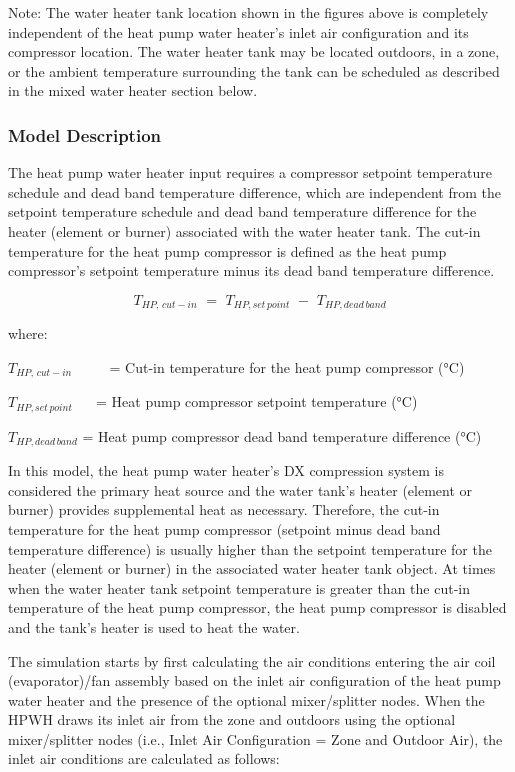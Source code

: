 Note: The water heater tank location shown in the figures above is completely independent of the heat pump water heater's inlet air configuration and its compressor location. The water heater tank may be located outdoors, in a zone, or the ambient temperature surrounding the tank can be scheduled as described in the mixed water heater section below.

\subsubsection{Model Description}\label{model-description-016}

The heat pump water heater input requires a compressor setpoint temperature schedule and dead band temperature difference, which are independent from the setpoint temperature schedule and dead band temperature difference for the heater (element or burner) associated with the water heater tank. The cut-in temperature for the heat pump compressor is defined as the heat pump compressor's setpoint temperature minus its dead band temperature difference.

\begin{equation}
{T_{HP,\,cut - in}}\,\, = \,\,{T_{HP,set\,point}}\,\, - \,\,{T_{HP,dead\,band}}
\end{equation}

where:

\({T_{HP,\,cut - in}}\) ~~~~ = Cut-in temperature for the heat pump compressor (°C)

\({T_{HP,set\,point}}\) ~~ = Heat pump compressor setpoint temperature (°C)

\({T_{HP,dead\,band}}\) = Heat pump compressor dead band temperature difference (°C)

In this model, the heat pump water heater's DX compression system is considered the primary heat source and the water tank's heater (element or burner) provides supplemental heat as necessary. Therefore, the cut-in temperature for the heat pump compressor (setpoint minus dead band temperature difference) is usually higher than the setpoint temperature for the heater (element or burner) in the associated water heater tank object. At times when the water heater tank setpoint temperature is greater than the cut-in temperature of the heat pump compressor, the heat pump compressor is disabled and the tank's heater is used to heat the water.

The simulation starts by first calculating the air conditions entering the air coil (evaporator)/fan assembly based on the inlet air configuration of the heat pump water heater and the presence of the optional mixer/splitter nodes. When the HPWH draws its inlet air from the zone and outdoors using the optional mixer/splitter nodes (i.e., Inlet Air Configuration = Zone and Outdoor Air), the inlet air conditions are calculated as follows:

